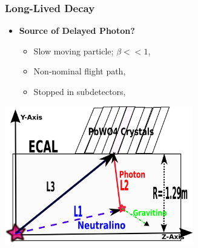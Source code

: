 \documentclass{beamer}
\begin{document}
\begin{frame}
\frametitle{Long-Lived Decay}
\begin{minipage}[t]{0.5\paperwidth}
   \begin{itemize}
    \item \textcolor{UMN@Maroon}{\textbf{Source of Delayed Photon?}}
     \begin{itemize}
      \item Slow moving particle; $\beta << 1$,
      \item Non-nominal flight path,
      \item Stopped in subdetectors,
     \end{itemize}
      
 \end{itemize}  
\end{minipage}

\begin{minipage}[t]{0.7\paperwidth}
\centering
   \includegraphics[height=6cm, width=0.8\paperwidth]{THESISPLOTS/DelayedPhoton-ECAL.png}
\end{minipage}
\end{frame}
\end{document}
